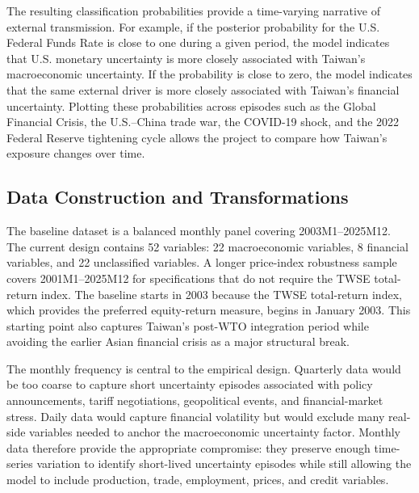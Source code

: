 \documentclass[12pt]{article}
\begin{document}
The resulting classification probabilities provide a time-varying narrative of external transmission.
For example, if the posterior probability for the U.S. Federal Funds Rate is close to one during a
given period, the model indicates that U.S. monetary uncertainty is more closely associated with
Taiwan's macroeconomic uncertainty. If the probability is close to zero, the model indicates that
the same external driver is more closely associated with Taiwan's financial uncertainty. Plotting
these probabilities across episodes such as the Global Financial Crisis, the U.S.--China trade war,
the COVID-19 shock, and the 2022 Federal Reserve tightening cycle allows the project to compare
how Taiwan's exposure changes over time.

\subsection{Data Construction and Transformations}

The baseline dataset is a balanced monthly panel covering 2003M1--2025M12. The current design
contains 52 variables: 22 macroeconomic variables, 8 financial variables, and 22 unclassified
variables. A longer price-index robustness sample covers 2001M1--2025M12 for specifications
that do not require the TWSE total-return index. The baseline starts in 2003 because the TWSE
total-return index, which provides the preferred equity-return measure, begins in January 2003.
This starting point also captures Taiwan's post-WTO integration period while avoiding the earlier
Asian financial crisis as a major structural break.

The monthly frequency is central to the empirical design. Quarterly data would be too coarse
to capture short uncertainty episodes associated with policy announcements, tariff negotiations,
geopolitical events, and financial-market stress. Daily data would capture financial volatility but
would exclude many real-side variables needed to anchor the macroeconomic uncertainty factor.
Monthly data therefore provide the appropriate compromise: they preserve enough time-series
variation to identify short-lived uncertainty episodes while still allowing the model to include
production, trade, employment, prices, and credit variables.
\end{document}
